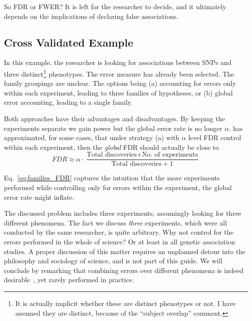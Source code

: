 \documentclass[review,12pt]{article}
\theoremstyle{definition}
\theoremstyle{definition}
\begin{document}
So FDR or FWER? It is left for the researcher to decide, and it ultimately depends on the implications of declaring false associations. 





\subsection{\label{sec:cross_validated}Cross Validated Example}

In this example, the researcher is looking for associations between SNPs and three distinct\footnote{ It is actually implicit whether these are distinct phenotypes or not. I have assumed they are distinct, because of the ``subject overlap'' comment.} phenotypes. The error measure has already been selected. The family groupings are unclear. 
The options being (a) accounting for errors only within each experiment, leading to three families of hypotheses, or (b) global error accounting, leading to a single family. 

Both approaches have their advantages and disadvantages. 
By keeping the experiments separate we gain power but the global error rate is no longer $\alpha$. \citet{yekutieli_hierarchical_2008} has approximated, for some cases, that under strategy (a) with $\alpha$ level FDR control within each experiment, then the \emph{global} FDR should actually be close to 
\begin{equation} 
	FDR \approx \alpha \cdot \frac{\text{Total discoveries} + 
	\text{No. of experiments}}{\text{Total discoveries}+1} \label{eq:families_FDR}
\end{equation}

Eq.~\ref{eq:families_FDR} captures the intuition that the more experiments performed while controlling only for errors within the experiment, the global error rate might inflate. 

The discussed problem includes three experiments, assumingly looking for three different phenomena. The fact we discuss \emph{three} experiments, which were all conducted by the same researcher, is quite arbitrary. Why not control for the errors performed in the whole of science? Or at least in all genetic association studies. 
A proper discussion of this matter requires an unplanned detour into the philosophy and sociology of science, and is not part of this guide. 
We will conclude by remarking that combining errors over different phenomena is indeed  desirable~\cite{ioannidis_why_2005}, yet rarely performed in practice. 
\end{document}
